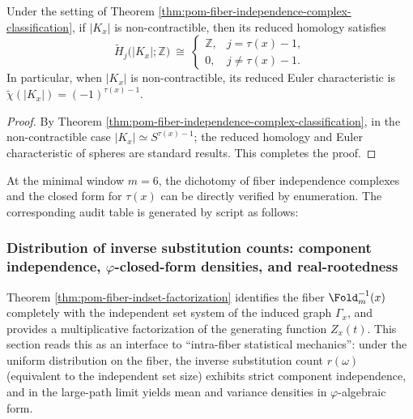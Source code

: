 \begin{corollary}\label{cor:pom-fiber-independence-complex-homology}
Under the setting of Theorem \ref{thm:pom-fiber-independence-complex-classification},
if \(|K_x|\) is non-contractible, then its reduced homology satisfies
\[
\widetilde H_j\bigl(|K_x|;\mathbb Z\bigr)\ \cong\
\begin{cases}
\mathbb Z,& j=\tau(x)-1,\\
0,& j\neq \tau(x)-1.
\end{cases}
\]
In particular, when \(|K_x|\) is non-contractible, its reduced Euler characteristic is \(\widetilde\chi(|K_x|)=(-1)^{\tau(x)-1}\).
\end{corollary}
\begin{proof}
By Theorem \ref{thm:pom-fiber-independence-complex-classification}, in the non-contractible case \(|K_x|\simeq S^{\tau(x)-1}\);
the reduced homology and Euler characteristic of spheres are standard results. This completes the proof.
\end{proof}

\begin{remark}\label{rem:pom-fiber-indcomplex-audit-m6}
At the minimal window \(m=6\), the dichotomy of fiber independence complexes and the closed form for \(\tau(x)\) can be directly verified by enumeration.
The corresponding audit table is generated by script as follows:

\end{remark}

\subsubsection{Distribution of inverse substitution counts: component independence, \texorpdfstring{$\varphi$}{phi}-closed-form densities, and real-rootedness}\label{subsubsec:pom-fiber-rewrite-statistics}

Theorem \ref{thm:pom-fiber-indset-factorization} identifies the fiber \(\Fold_m^{-1}(x)\) completely with the independent set system of the induced graph \(\Gamma_x\),
and provides a multiplicative factorization of the generating function \(Z_x(t)\).
This section reads this as an interface to ``intra-fiber statistical mechanics'': under the uniform distribution on the fiber,
the inverse substitution count \(r(\omega)\) (equivalent to the independent set size) exhibits strict component independence,
and in the large-path limit yields mean and variance densities in \(\varphi\)-algebraic form.

